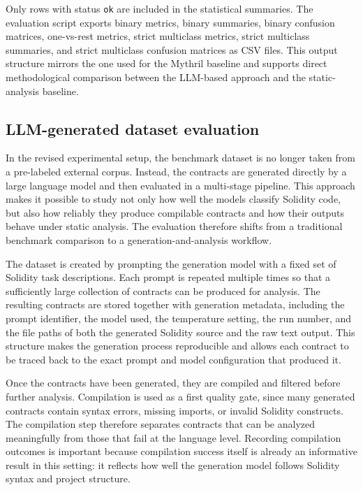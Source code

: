 \documentclass[a4paper,11pt]{article}\usepackage{graphicx} %
\begin{document}
Only rows with status \texttt{ok} are included in the statistical summaries. The evaluation script exports binary metrics, binary summaries, binary confusion matrices, one-vs-rest metrics, strict multiclass metrics, strict multiclass summaries, and strict multiclass confusion matrices as CSV files. This output structure mirrors the one used for the Mythril baseline and supports direct methodological comparison between the LLM-based approach and the static-analysis baseline.

\subsection{LLM-generated dataset evaluation}

In the revised experimental setup, the benchmark dataset is no longer taken from a pre-labeled external corpus. Instead, the contracts are generated directly by a large language model and then evaluated in a multi-stage pipeline. This approach makes it possible to study not only how well the models classify Solidity code, but also how reliably they produce compilable contracts and how their outputs behave under static analysis. The evaluation therefore shifts from a traditional benchmark comparison to a generation-and-analysis workflow.

The dataset is created by prompting the generation model with a fixed set of Solidity task descriptions. Each prompt is repeated multiple times so that a sufficiently large collection of contracts can be produced for analysis. The resulting contracts are stored together with generation metadata, including the prompt identifier, the model used, the temperature setting, the run number, and the file paths of both the generated Solidity source and the raw text output. This structure makes the generation process reproducible and allows each contract to be traced back to the exact prompt and model configuration that produced it.

Once the contracts have been generated, they are compiled and filtered before further analysis. Compilation is used as a first quality gate, since many generated contracts contain syntax errors, missing imports, or invalid Solidity constructs. The compilation step therefore separates contracts that can be analyzed meaningfully from those that fail at the language level. Recording compilation outcomes is important because compilation success itself is already an informative result in this setting: it reflects how well the generation model follows Solidity syntax and project structure.
\end{document}
